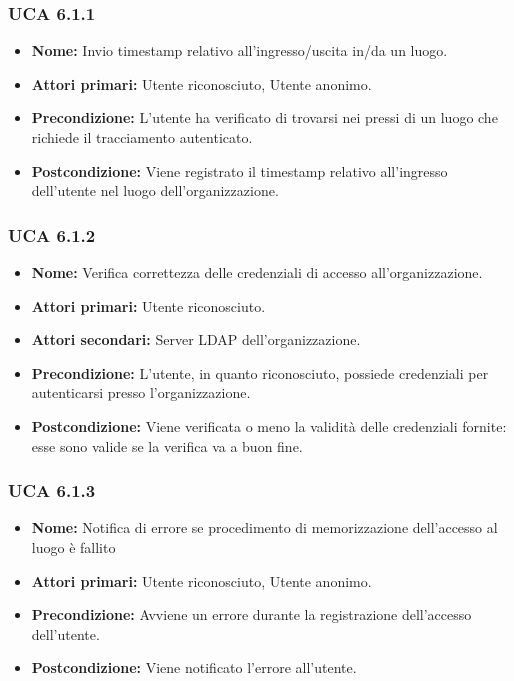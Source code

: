 \subsubsection{UCA 6.1.1}%
\begin{itemize}
	\item \textbf{Nome:} Invio timestamp relativo all'ingresso/uscita in/da un luogo.
	\item \textbf{Attori primari:} Utente riconosciuto, Utente anonimo.
	\item \textbf{Precondizione:} L'utente ha verificato di trovarsi nei pressi di un luogo che richiede il tracciamento autenticato.
	\item \textbf{Postcondizione:} Viene registrato il timestamp relativo all'ingresso dell'utente nel luogo dell'organizzazione.
\end{itemize}

\subsubsection{UCA 6.1.2}%
\begin{itemize}
	\item \textbf{Nome:} Verifica correttezza delle credenziali di accesso all'organizzazione.
	\item \textbf{Attori primari:} Utente riconosciuto.
	\item \textbf{Attori secondari:} Server LDAP dell'organizzazione.
	\item \textbf{Precondizione:} L'utente, in quanto riconosciuto, possiede credenziali per autenticarsi presso l'organizzazione.
	\item \textbf{Postcondizione:} Viene verificata o meno la validità delle credenziali fornite: esse sono valide se la verifica va a buon fine.
\end{itemize}

\subsubsection{UCA 6.1.3}%
\begin{itemize}
	\item \textbf{Nome:} Notifica di errore se procedimento di memorizzazione dell'accesso al luogo è fallito
	\item \textbf{Attori primari:} Utente riconosciuto, Utente anonimo.
	\item \textbf{Precondizione:} Avviene un errore durante la registrazione dell'accesso dell'utente.
	\item \textbf{Postcondizione:} Viene notificato l'errore all'utente.
\end{itemize}

